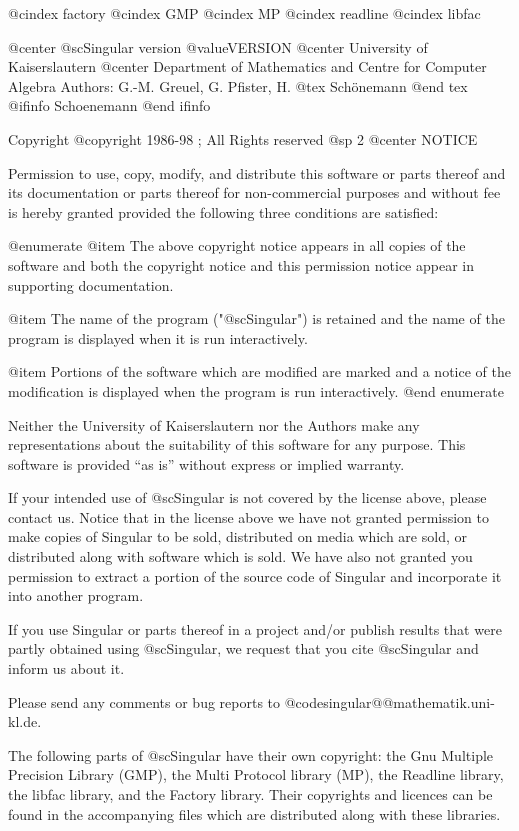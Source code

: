 @cindex factory
@cindex GMP
@cindex MP
@cindex readline
@cindex libfac

@center @sc{Singular} version @value{VERSION}
@center University of Kaiserslautern
@center Department of Mathematics and Centre for Computer Algebra
Authors: G.-M. Greuel, G. Pfister, H.
@tex
 Sch\"onemann
@end tex
@ifinfo
 Schoenemann
@end ifinfo

Copyright @copyright{} 1986-98 ; All Rights reserved
@sp 2
                                @center NOTICE


Permission to use, copy, modify, and distribute this software or parts
thereof and its documentation or parts thereof for non-commercial
purposes and without fee is hereby granted provided the following three
conditions are satisfied:

@enumerate
@item
The above copyright notice appears in all copies of the software
and both the copyright notice and this permission notice
appear in supporting documentation.

@item
The name of the program ("@sc{Singular}") is retained and the name of
the program is displayed when it is run interactively.

@item
Portions of the software which are modified are marked and a notice of the
modification is displayed when the program is run interactively.
@end enumerate

Neither the University of Kaiserslautern nor the Authors make any
representations about the suitability of this software for any
purpose.  This software is provided ``as is'' without express or
implied warranty.

If your intended use of @sc{Singular} is not covered by the license above,
please contact us.  Notice that in the license above we have not
granted permission to make copies of Singular to be sold, distributed
on media which are sold, or distributed along with software which is
sold. We have also not granted you permission to extract a portion
of the source code of Singular and incorporate it into another program.

If you use Singular or parts thereof in a project and/or publish
results that were partly obtained using @sc{Singular}, we request that you
cite @sc{Singular} and inform us about it.

Please send any comments or bug reports to
@code{singular@@mathematik.uni-kl.de}.

The following parts of @sc{Singular} have their own copyright: the Gnu Multiple
Precision Library (GMP), the Multi Protocol library (MP), the Readline library,
the libfac library,  and the Factory library.
Their copyrights and licences can be found in the accompanying files
which are distributed along with these libraries.

